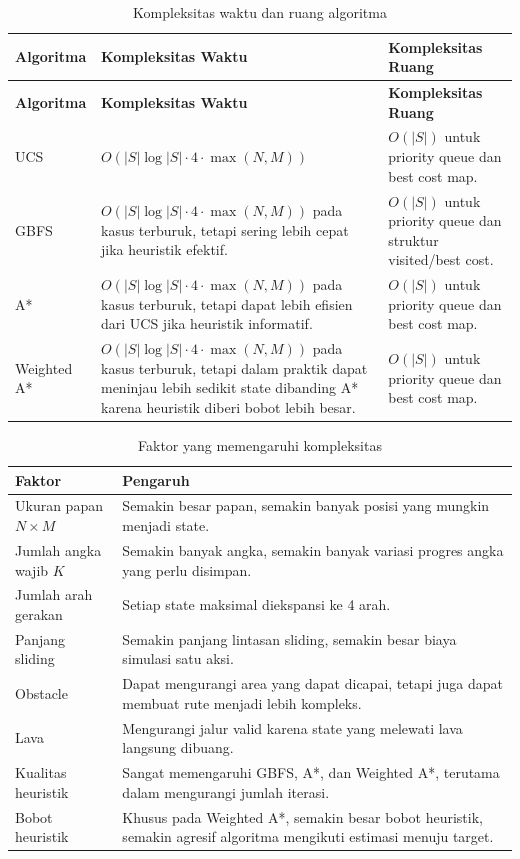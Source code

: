 \begin{longtable}{|p{3cm}|p{5.2cm}|p{5.7cm}|}
	\caption{Kompleksitas waktu dan ruang algoritma} \\
	\hline
	\rowcolor{purple!15}
	\textbf{Algoritma} & \textbf{Kompleksitas Waktu} & \textbf{Kompleksitas Ruang} \\
	\hline
	\endfirsthead
	
	\hline
	\rowcolor{purple!15}
	\textbf{Algoritma} & \textbf{Kompleksitas Waktu} & \textbf{Kompleksitas Ruang} \\
	\hline
	\endhead
	
	UCS & $O(|S| \log |S| \cdot 4 \cdot \max(N,M))$ & $O(|S|)$ untuk priority queue dan best cost map. \\
	\hline
	GBFS & $O(|S| \log |S| \cdot 4 \cdot \max(N,M))$ pada kasus terburuk, tetapi sering lebih cepat jika heuristik efektif. & $O(|S|)$ untuk priority queue dan struktur visited/best cost. \\
	\hline
	A* & $O(|S| \log |S| \cdot 4 \cdot \max(N,M))$ pada kasus terburuk, tetapi dapat lebih efisien dari UCS jika heuristik informatif. & $O(|S|)$ untuk priority queue dan best cost map. \\
	\hline
	Weighted A* & $O(|S| \log |S| \cdot 4 \cdot \max(N,M))$ pada kasus terburuk, tetapi dalam praktik dapat meninjau lebih sedikit state dibanding A* karena heuristik diberi bobot lebih besar. & $O(|S|)$ untuk priority queue dan best cost map. \\
	\hline
\end{longtable}

\begin{table}[H]
	\centering
	\caption{Faktor yang memengaruhi kompleksitas}
	\begin{tabular}{|p{4.5cm}|p{9.5cm}|}
		\hline
		\rowcolor{purple!15}
		\textbf{Faktor} & \textbf{Pengaruh} \\
		\hline
		Ukuran papan $N \times M$ & Semakin besar papan, semakin banyak posisi yang mungkin menjadi state. \\
		\hline
		Jumlah angka wajib $K$ & Semakin banyak angka, semakin banyak variasi progres angka yang perlu disimpan. \\
		\hline
		Jumlah arah gerakan & Setiap state maksimal diekspansi ke 4 arah. \\
		\hline
		Panjang sliding & Semakin panjang lintasan sliding, semakin besar biaya simulasi satu aksi. \\
		\hline
		Obstacle & Dapat mengurangi area yang dapat dicapai, tetapi juga dapat membuat rute menjadi lebih kompleks. \\
		\hline
		Lava & Mengurangi jalur valid karena state yang melewati lava langsung dibuang. \\
		\hline
		Kualitas heuristik & Sangat memengaruhi GBFS, A*, dan Weighted A*, terutama dalam mengurangi jumlah iterasi. \\
		\hline
		Bobot heuristik & Khusus pada Weighted A*, semakin besar bobot heuristik, semakin agresif algoritma mengikuti estimasi menuju target. \\
		\hline
	\end{tabular}
\end{table}

